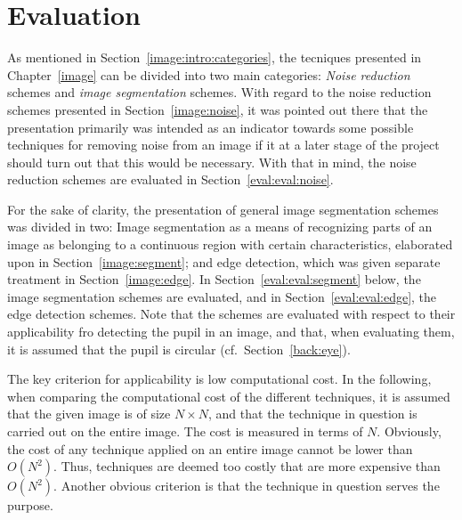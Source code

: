 
\section{Evaluation}
\label{eval:eval}

As mentioned in Section~\ref{image:intro:categories}, the tecniques
presented in Chapter~\ref{image} can be divided into two main
categories: {\em Noise reduction\/} schemes and {\em image
  segmentation\/} schemes.  With regard to the noise reduction schemes
presented in Section~\ref{image:noise}, it was pointed out there that
the presentation primarily was intended as an indicator towards some
possible techniques for removing noise from an image if it at a later
stage of the project should turn out that this would be necessary.
With that in mind, the noise reduction schemes are evaluated in
Section~\ref{eval:eval:noise}.

For the sake of clarity, the presentation of general image
segmentation schemes was divided in two: Image segmentation as a means
of recognizing parts of an image as belonging to a continuous region
with certain characteristics, elaborated upon in
Section~\ref{image:segment}; and edge detection, which was given
separate treatment in Section~\ref{image:edge}.  In
Section~\ref{eval:eval:segment} below, the image segmentation schemes
are evaluated, and in Section~\ref{eval:eval:edge}, the edge detection
schemes.  Note that the schemes are evaluated with respect to their
applicability fro detecting the pupil in an image, and that, when
evaluating them, it is assumed that the pupil is circular (cf.\
Section~\ref{back:eye}).

The key criterion for applicability is low computational cost.  In the
following, when comparing the computational cost of the different
techniques, it is assumed that the given image is of size $N\times N$,
and that the technique in question is carried out on the entire image.
The cost is measured in terms of $N$.  Obviously, the cost of any
technique applied on an entire image cannot be lower than $O(N^{2})$.
Thus, techniques are deemed too costly that are more expensive than
$O(N^{2})$.  Another obvious criterion is that the technique in
question serves the purpose.

